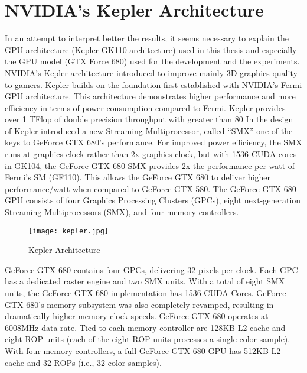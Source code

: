 \section{NVIDIA's Kepler Architecture}
In an attempt to interpret better the results, it seems necessary to explain the GPU architecture (Kepler GK110 architecture) used in this thesis and especially the GPU model (GTX Force 680) used for the development and the experiments.
NVIDIA’s Kepler architecture introduced to improve mainly 3D graphics quality to gamers. Kepler builds on the foundation first established with NVIDIA's Fermi GPU architecture. This architecture demonstrates higher performance and more efficiency in terms of power consumption compared to Fermi. Kepler provides over 1 TFlop of double precision throughput with greater than 80%
 In the design of Kepler introduced a new Streaming Multiprocessor, called “SMX” one of the keys to GeForce GTX 680’s performance. For improved power efficiency, the SMX runs at graphics clock rather than 2x graphics clock, but with 1536 CUDA cores in GK104, the GeForce GTX 680 SMX provides 2x the performance per watt of Fermi’s SM (GF110). This allows the GeForce GTX 680 to deliver higher performance/watt when compared to GeForce GTX 580. The GeForce GTX 680 GPU consists of four Graphics Processing Clusters (GPCs), eight next-generation Streaming Multiprocessors (SMX), and four memory controllers.
 
 
 \begin{figure}[H]
    \centering
        \texttt{[image: kepler.jpg]}
    \caption{Kepler Architecture}
    \label{fig:Kepler}
\end{figure}


GeForce GTX 680 contains four GPCs, delivering 32 pixels per clock. Each GPC has a dedicated raster engine and two SMX units. With a total of eight SMX units, the GeForce GTX 680 implementation has 1536 CUDA Cores.  GeForce GTX 680’s memory subsystem was also completely revamped, resulting in dramatically higher memory clock speeds. GeForce GTX 680 operates at 6008MHz data rate. Tied to each memory controller are 128KB L2 cache and eight ROP units (each of the eight ROP units processes a single color sample). With four memory controllers, a full GeForce GTX 680 GPU has 512KB L2 cache and 32 ROPs (i.e., 32 color samples).

